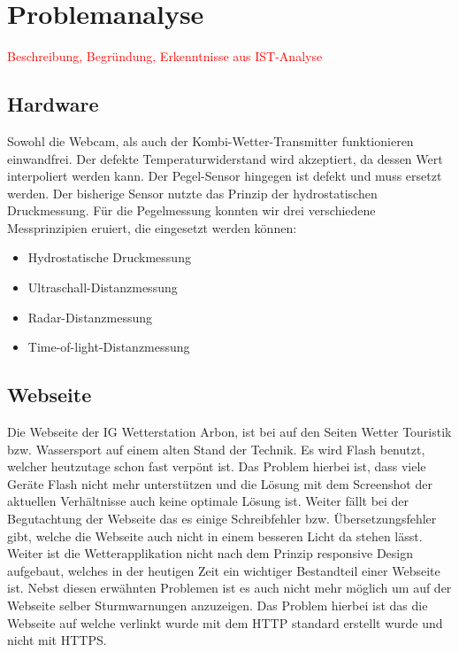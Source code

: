 \documentclass[a4paper,ngerman, 11pt]{report}
\newcommand\Diskussionspunkt[1]{\textcolor{red}{#1}}
\begin{document}
\section{Problemanalyse}
\Diskussionspunkt{Beschreibung, 
Begründung, 
Erkenntnisse aus IST-Analyse}

\subsection{Hardware}
Sowohl die Webcam, als auch der Kombi-Wetter-Transmitter funktionieren einwandfrei. Der defekte Temperaturwiderstand wird akzeptiert, da dessen Wert interpoliert werden kann. Der Pegel-Sensor hingegen ist defekt und muss ersetzt werden. Der bisherige Sensor nutzte das Prinzip der hydrostatischen Druckmessung. Für die Pegelmessung konnten wir drei verschiedene Messprinzipien eruiert, die eingesetzt werden können:

\begin{itemize}  
\item Hydrostatische Druckmessung
\item Ultraschall-Distanzmessung
\item Radar-Distanzmessung
\item Time-of-light-Distanzmessung
\end{itemize}

\subsection{Webseite}
Die Webseite der IG Wetterstation Arbon, ist bei auf den Seiten Wetter Touristik bzw. Wassersport auf einem alten Stand der Technik. Es wird Flash benutzt, welcher heutzutage schon fast verpönt ist. Das Problem hierbei ist, dass viele Geräte Flash nicht mehr unterstützen und die Lösung mit dem Screenshot der aktuellen Verhältnisse auch keine optimale Lösung ist. Weiter fällt bei der Begutachtung der Webseite das es einige Schreibfehler bzw. Übersetzungsfehler gibt, welche die Webseite auch nicht in einem besseren Licht da stehen lässt. Weiter ist die Wetterapplikation nicht nach dem Prinzip responsive Design aufgebaut, welches in der heutigen Zeit ein wichtiger Bestandteil einer Webseite ist. Nebst diesen erwähnten Problemen ist es auch nicht mehr möglich um auf der Webseite selber Sturmwarnungen anzuzeigen. Das Problem hierbei ist das die Webseite auf welche verlinkt wurde mit dem HTTP standard erstellt wurde und nicht mit HTTPS.
\end{document}
